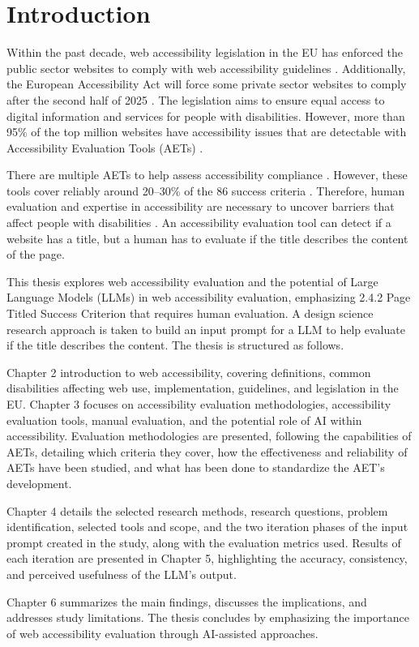 \chapter{Introduction\label{intro}}

Within the past decade, web accessibility legislation in the EU has enforced the public sector websites to comply with web accessibility guidelines \citep{eudirective2016}. Additionally, the European Accessibility Act will force some private sector websites to comply after the second half of 2025 \citep{eudirective2019}. The legislation aims to ensure equal access to digital information and services for people with disabilities. However, more than 95\% of the top million websites have accessibility issues that are detectable with Accessibility Evaluation Tools (AETs) \citep{webaimmillions}.

There are multiple AETs to help assess accessibility compliance \citep{govukaccessibility}. However, these tools cover reliably around 20--30\% of the 86 success criteria \citep{govukaccessibilityresults, dequecoverage, webaimmillions}. Therefore, human evaluation and expertise in accessibility are necessary to uncover barriers that affect people with disabilities \citep{wcagevaluationtools}. An accessibility evaluation tool can detect if a website has a title, but a human has to evaluate if the title describes the content of the page. 

This thesis explores web accessibility evaluation and the potential of Large Language Models (LLMs) in web accessibility evaluation, emphasizing 2.4.2 Page Titled Success Criterion that requires human evaluation. A design science research approach is taken to build an input prompt for a LLM to help evaluate if the title describes the content. The thesis is structured as follows.

Chapter 2 introduction to web accessibility, covering definitions, common disabilities affecting web use, implementation, guidelines, and legislation in the EU. Chapter 3 focuses on accessibility evaluation methodologies, accessibility evaluation tools, manual evaluation, and the potential role of AI within accessibility. Evaluation methodologies are presented, following the capabilities of AETs, detailing which criteria they cover, how the effectiveness and reliability of AETs have been studied, and what has been done to standardize the AET's development.

Chapter 4 details the selected research methods, research questions, problem identification, selected tools and scope, and the two iteration phases of the input prompt created in the study, along with the evaluation metrics used. Results of each iteration are presented in Chapter 5, highlighting the accuracy, consistency, and perceived usefulness of the LLM's output.

Chapter 6 summarizes the main findings, discusses the implications, and addresses study limitations. The thesis concludes by emphasizing the importance of web accessibility evaluation through AI-assisted approaches.
